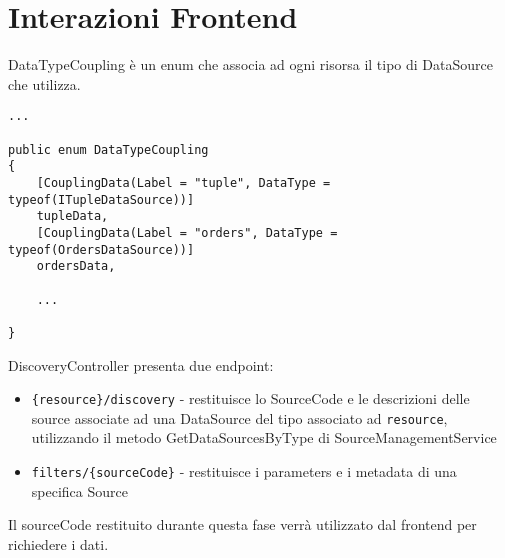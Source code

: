 \section{Interazioni Frontend}
\label{chap:frontend}
DataTypeCoupling è un enum che associa ad ogni risorsa il tipo di DataSource che utilizza.
\begin{lstlisting}[caption={DataTypeCoupling.cs}, style=sharpCode]
...

public enum DataTypeCoupling
{
    [CouplingData(Label = "tuple", DataType = typeof(ITupleDataSource))]
    tupleData,
    [CouplingData(Label = "orders", DataType = typeof(OrdersDataSource))]
    ordersData,

    ... 

}
\end{lstlisting}
DiscoveryController presenta due endpoint:
\begin{itemize}
\item \verb|{resource}/discovery| - restituisce lo SourceCode e le descrizioni delle source associate ad una DataSource del tipo associato ad \verb|resource|, utilizzando il metodo GetDataSourcesByType di SourceManagementService
\item \verb|filters/{sourceCode}| - restituisce i parameters e i metadata di una specifica Source
\end{itemize}
Il sourceCode restituito durante questa fase verrà utilizzato dal frontend per richiedere i dati.

